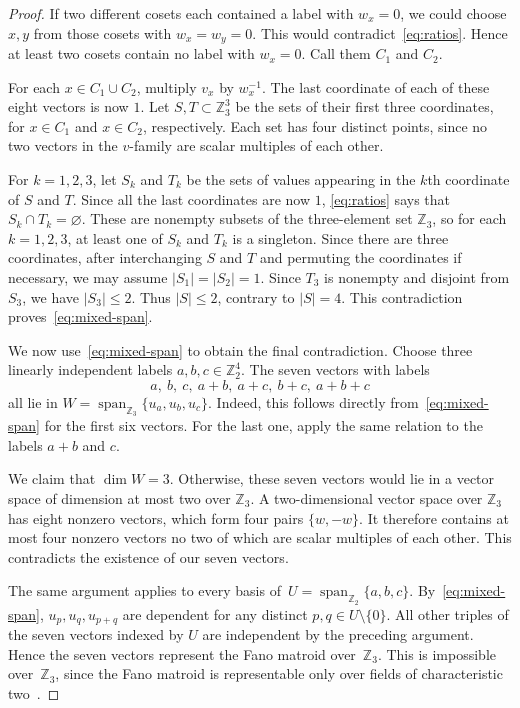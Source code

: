 \documentclass{amsart}
\theoremstyle{plain}
\numberwithin{equation}{section}
\theoremstyle{remark}
\theoremstyle{definition}
\newcommand{\Z}{\mathbb Z}
\newcommand{\spn}[2]{\operatorname{span}_{\Z_#1}\{#2\}}
\begin{document}
\begin{proof}
If two different cosets each contained a label with $w_x=0$, we could choose $x,y$ from those cosets with $w_x=w_y=0$.
This would contradict~\eqref{eq:ratios}.
Hence at least two cosets contain no label with $w_x=0$.
Call them $C_1$ and $C_2$.

For each $x\in C_1\cup C_2$, multiply $v_x$ by $w_x^{-1}$.
The last coordinate of each of these eight vectors is now $1$.
Let $S,T\subset\Z_3^3$ be the sets of their first three coordinates, for $x\in C_1$ and $x\in C_2$, respectively.
Each set has four distinct points, since no two vectors in the $v$-family are scalar multiples of each other.

For $k=1,2,3$, let $S_k$ and $T_k$ be the sets of values appearing in the $k$th coordinate of $S$ and $T$.
Since all the last coordinates are now $1$, \eqref{eq:ratios} says that $S_k\cap T_k=\varnothing$.
These are nonempty subsets of the three-element set $\Z_3$, so for each $k=1,2,3$, at least one of $S_k$ and $T_k$ is a singleton.
Since there are three coordinates, after interchanging $S$ and $T$ and permuting the coordinates if necessary, we may assume $|S_1| = |S_2| = 1$.
Since $T_3$ is nonempty and disjoint from $S_3$, we have $|S_3| \leq 2$.
Thus $|S| \leq 2$, contrary to $|S| = 4$.
This contradiction proves~\eqref{eq:mixed-span}.

We now use~\eqref{eq:mixed-span} to obtain the final contradiction.
Choose three linearly independent labels $a,b,c\in\Z_2^4$.
The seven vectors with labels
$$
    a,\ b,\ c,\ a+b,\ a+c,\ b+c,\ a+b+c
$$
all lie in $ W=\spn{3}{u_a,u_b,u_c}$.
Indeed, this follows directly from~\eqref{eq:mixed-span} for the first six vectors.
For the last one, apply the same relation to the labels $a+b$ and $c$.

We claim that $\dim W=3$.
Otherwise, these seven vectors would lie in a vector space of dimension at most two over $\Z_3$.
A two-dimensional vector space over $\Z_3$ has eight nonzero vectors, which form four pairs $\{w,-w\}$.
It therefore contains at most four nonzero vectors no two of which are scalar multiples of each other.
This contradicts the existence of our seven vectors.

The same argument applies to every basis of~$U=\spn{2}{a,b,c}$.
By~\eqref{eq:mixed-span}, $u_p,u_q,u_{p+q}$ are dependent for any distinct $p, q \in U \setminus \{0\}$.
All other triples of the seven vectors indexed by $U$ are independent by the preceding argument.
Hence the seven vectors represent the Fano matroid over~$\Z_3$.
This is impossible over~$\Z_3$, since the Fano matroid is representable only over fields of characteristic two~\cite[Proposition~6.4.8(i)]{Oxley2011book}.
\end{proof}
\end{document}
